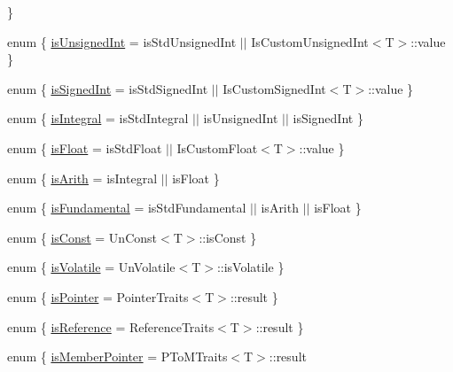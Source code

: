 \begin{DoxyCompactItemize}
 \}
\item 
enum \{ \mbox{\hyperlink{classUtil_1_1TypeTraits_a88f2e9de4143a8e63402e6ec6830c5f5a491d7fd4750cb0d1a2dcbeb5fc3456d1}{is\+Unsigned\+Int}} = is\+Std\+Unsigned\+Int $\vert$$\vert$ Is\+Custom\+Unsigned\+Int$<$T$>$\+:\+:value
 \}
\item 
enum \{ \mbox{\hyperlink{classUtil_1_1TypeTraits_a3ba071c65cca8d8bc84e736a182a1569a238eb902c14c6c61c1f4baa46e56c461}{is\+Signed\+Int}} = is\+Std\+Signed\+Int $\vert$$\vert$ Is\+Custom\+Signed\+Int$<$T$>$\+:\+:value
 \}
\item 
enum \{ \mbox{\hyperlink{classUtil_1_1TypeTraits_ad28ca1ecffbf544a467e2bf0eddc3b41ae3cb8ddfe928cd1a6dc3438e54a5b74f}{is\+Integral}} = is\+Std\+Integral $\vert$$\vert$ is\+Unsigned\+Int $\vert$$\vert$ is\+Signed\+Int
 \}
\item 
enum \{ \mbox{\hyperlink{classUtil_1_1TypeTraits_abeef28fc167db26d4a304c6c4f650bd3a53a8c88c40192f095328053a89109888}{is\+Float}} = is\+Std\+Float $\vert$$\vert$ Is\+Custom\+Float$<$T$>$\+:\+:value
 \}
\item 
enum \{ \mbox{\hyperlink{classUtil_1_1TypeTraits_a01d5d54588585427e0715f4921024601aacdb8f6332a550ea4ebaf1ff8014b127}{is\+Arith}} = is\+Integral $\vert$$\vert$ is\+Float
 \}
\item 
enum \{ \mbox{\hyperlink{classUtil_1_1TypeTraits_a5f6c0ebf34a75e27262aae3a527392f9a20a90cf2934e5a2c26599d7f051f8675}{is\+Fundamental}} = is\+Std\+Fundamental $\vert$$\vert$ is\+Arith $\vert$$\vert$ is\+Float
 \}
\item 
enum \{ \mbox{\hyperlink{classUtil_1_1TypeTraits_a99cd5bc4b087089f352434d7f482e1cba26a0a78aeec8fa5c5c02c774b73585cd}{is\+Const}} = Un\+Const$<$T$>$\+:\+:is\+Const
 \}
\item 
enum \{ \mbox{\hyperlink{classUtil_1_1TypeTraits_abc08b845a07e81bbc4a304c6f3b24b51ad832c3ecd956e173f499202b8a249453}{is\+Volatile}} = Un\+Volatile$<$T$>$\+:\+:is\+Volatile
 \}
\item 
enum \{ \mbox{\hyperlink{classUtil_1_1TypeTraits_ad90505183742eb4b62bc41bd4121fc19a0813f58ed7af0a00a07d0ba641cc3bba}{is\+Pointer}} = Pointer\+Traits$<$T$>$\+:\+:result
 \}
\item 
enum \{ \mbox{\hyperlink{classUtil_1_1TypeTraits_ad8ec6b7fcee82a1169b89d2da8419edaac0cdaf0e77f765430820e96bb7cf4619}{is\+Reference}} = Reference\+Traits$<$T$>$\+:\+:result
 \}
\item 
enum \{ \mbox{\hyperlink{classUtil_1_1TypeTraits_ad2b47cd121495f38449b1f8c10afb067abe04caa758890fee25930d96123265d2}{is\+Member\+Pointer}} = P\+To\+M\+Traits$<$T$>$\+:\+:result

\end{DoxyCompactItemize}
